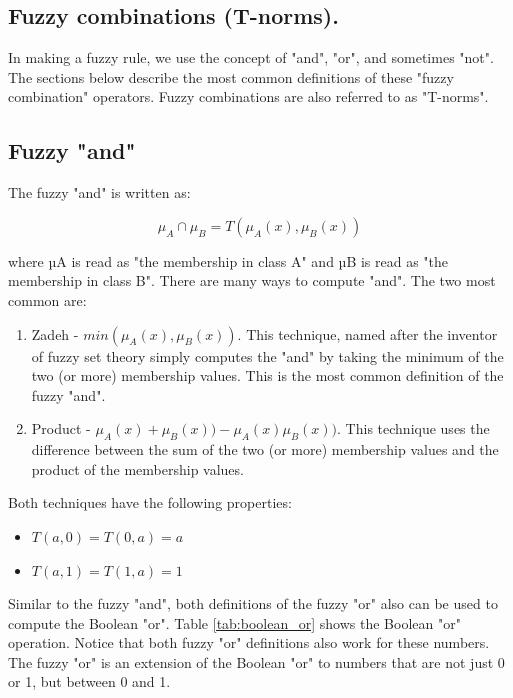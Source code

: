 \subsection{Fuzzy combinations (T-norms).}
In making a fuzzy rule, we use the concept of "and", "or", and sometimes "not".
The sections below describe the most common definitions of these
"fuzzy combination" operators. Fuzzy combinations are also referred to as "T-norms".

\subsection{Fuzzy "and"}

The fuzzy "and" is written as:

\begin{equation}\label{eq:prediction}
\displaystyle \mu_A\cap \mu_B = T(\mu_A(x),\mu_ B(x))
\end{equation}

where µA is read as "the membership in class A" and µB is read as "the
membership in class B". There are many ways to compute "and". The two most
common are:

\begin{enumerate}
\item Zadeh - $min(\mu_A(x), \mu_B(x))$. This technique, named after the
inventor of fuzzy set theory simply computes the "and" by taking the minimum of
the two (or more) membership values. This is the most common definition of the
fuzzy "and".
\item Product - $\mu_A(x) + \mu_B(x)) - \mu_A(x) \mu_B(x))$. This technique uses the
difference between the sum of the two (or more) membership values and the
product of the membership values.
\end{enumerate}

Both techniques have the following properties:
\begin{itemize}
\item $T(a,0) = T(0,a) = a$
\item $T(a,1) = T(1,a) = 1$
\end{itemize}
Similar to the fuzzy "and", both
definitions of the fuzzy "or" also can be used to compute the Boolean "or".
Table \ref{tab:boolean_or} shows the Boolean "or" operation. Notice that both fuzzy "or" definitions
also work for these numbers. The fuzzy "or" is an extension of the Boolean "or"
to numbers that are not just 0 or 1, but between 0 and 1.

